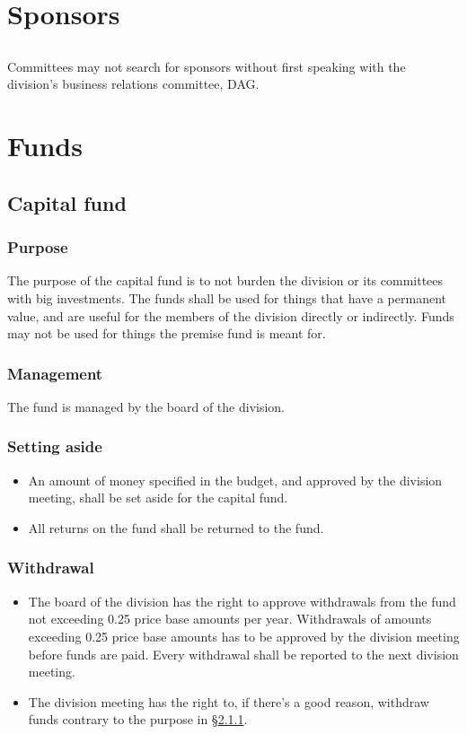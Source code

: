 \documentclass[a4paper]{dtek}
\begin{document}
\section{Sponsors}
\subsection{}
Committees may not search for sponsors without first speaking with the division's business relations committee, DAG.

\section{Funds}
\subsection{Capital fund}
\subsubsection{Purpose}
\label{sec:kapitalfond_syfte}
The purpose of the capital fund is to not burden the division or its committees with big investments. The funds shall be used for things that have a permanent value, and are useful for the members of the division directly or indirectly. Funds may not be used for things the premise fund is meant for.

\subsubsection{Management}
The fund is managed by the board of the division.

\subsubsection{Setting aside}
\begin{itemize}
    \item An amount of money specified in the budget, and approved by the division meeting, shall be set aside for the capital fund.
    \item All returns on the fund shall be returned to the fund.
\end{itemize}
\subsubsection{Withdrawal}
\begin{itemize}
    \item The board of the division has the right to approve withdrawals from the fund not exceeding 0.25 price base amounts per year. Withdrawals of amounts exceeding 0.25 price base amounts has to be approved by the division meeting before funds are paid. Every withdrawal shall be reported to the next division meeting.
    \item The division meeting has the right to, if there's a good reason, withdraw funds contrary to the purpose in §\ref{sec:kapitalfond_syfte}.
\end{itemize}
\end{document}
